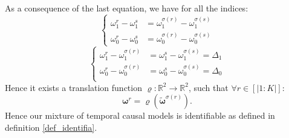 As a consequence of the last equation, we have for all the indices:
\begin{equation*}
\left\{
\begin{aligned}
\omega^r_{1}-\omega^s_{1} &= \omega^{\sigma(r)}_{1}-\omega^{\sigma(s)}_{1}\\
\omega^r_{ 0}-\omega^s_{ 0} &= \omega^{\sigma(r)}_{0}-\omega^{\sigma(s)}_{0}
     \end{aligned}
     \right.
\end{equation*}
\begin{equation*}
\left\{
\begin{aligned}
\omega^r_{1}-\omega^{\sigma(r)}_{1} &= \omega^s_{1}-\omega^{\sigma(s)}_{1} = \Delta_1\\
\omega^r_{ 0}-\omega^{\sigma(r)}_{0} &= \omega^s_{ 0}-\omega^{\sigma(s)}_{0} = \Delta_0\\
\end{aligned}
     \right.
 \end{equation*}
Hence it exists a translation function $\varrho: \mathbb{R}^2 \rightarrow \mathbb{R}^2$, such that $\forall r \in [|1:K|]$:
$$\boldsymbol{\omega}^r = \varrho(\tilde{\boldsymbol{\omega}}^{\sigma(r)}).$$
Hence our mixture of temporal causal models is identifiable as defined in definition \ref{def_identifia}.